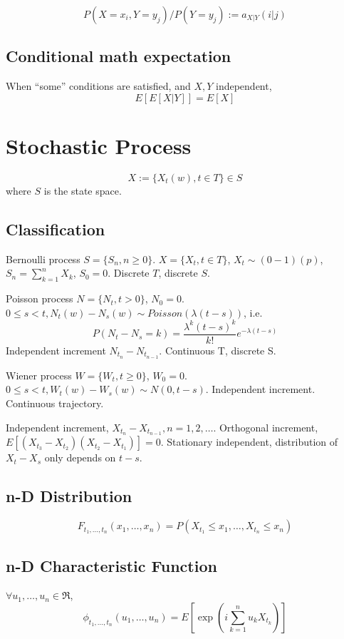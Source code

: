$$P(X=x_i, Y=y_j) / P(Y=y_j) := a_{X|Y}(i|j)$$

\subsection{Conditional math expectation}

When ``some'' conditions are satisfied, and $X,Y$ independent,
$$E[E[X|Y]] = E[X]$$

\section{Stochastic Process}

$$X := \{X_t(w), t\in T\} \in S$$
where $S$ is the state space.

\subsection{Classification}

Bernoulli process $S=\{S_n, n\ge 0\}$. $X=\{X_t, t\in T\}$, $X_t \sim (0-1)(p)$,
$S_n = \sum_{k=1}^n X_k$, $S_0 = 0$. Discrete $T$, discrete $S$.

Poisson process $N=\{N_t, t>0\}$, $N_0=0$. $0\leq s< t, N_t(w)-N_s(w)\sim Poisson(\lambda(t-s))$,
i.e. $$P(N_t-N_s=k)=\frac{\lambda^k(t-s)^k}{k!}e^{-\lambda(t-s)}$$ Independent
increment $N_{t_n}-N_{t_{n-1}}$. Continuous T, discrete S.

Wiener process $W=\{W_t, t\geq 0\}$, $W_0=0$. $0\leq s<t, W_t(w)-W_s(w)\sim N(0,t-s)$.
Independent increment. Continuous trajectory.

Independent increment, $X_{t_n}-X_{t_{n-1}}, n=1,2,\ldots$. Orthogonal increment,
$E[(X_{t_3}-X_{t_2})(X_{t_2}-X_{t_1})] = 0$. Stationary independent, distribution
of $X_t-X_s$ only depends on $t-s$.

\subsection{n-D Distribution}

$$F_{t_1,\ldots,t_n}(x_1,\ldots,x_n)=P(X_{t_1}\leq x_1, \ldots, X_{t_n}\leq x_n)$$

\subsection{n-D Characteristic Function}

$\forall u_1,\ldots,u_n \in \Re$,
$$\phi_{t_1,\ldots,t_n}(u_1,\ldots,u_n)=E[\exp(i\sum_{k=1}^n u_kX_{t_k})]$$


